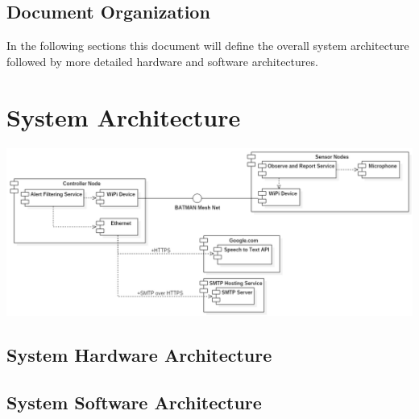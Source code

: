 \documentclass[11pt,a4paper]{article}
\begin{document}
\subsection{Document Organization}
\textnormal{In the following sections this document will define the overall system architecture followed by more detailed hardware and software architectures. }

\section{System Architecture}
\begin{center}
	\includegraphics[width=\textwidth, keepaspectratio=true]{Graphics/SystemArchitecture.png}
\end{center}

\subsection{System Hardware Architecture}

\subsection{System Software Architecture}
\end{document}
